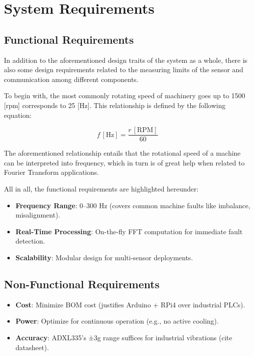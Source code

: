 \section{System Requirements} 
{ 
	
	
	\subsection{Functional Requirements} 
	{ 
		In addition to the aforementioned design traits of the system as a whole, there is also some design requirements related to the measuring limits of the sensor and communication among different components.
		
		To begin with, the most commonly rotating speed of machinery goes up to 1500 [rpm] corresponds to 25 [Hz]. This relationship is defined by the following equation: 
		
		\begin{equation}
			f \, [\mathrm{Hz}] = \frac{r \, [\mathrm{RPM}]}{60}
			\label{eq:freq_rpm}
		\end{equation}
		
		The aforementioned relationship entails that the rotational speed of a machine can be interpreted into frequency, which in turn is of great help when related to Fourier Transform applications.
		
		All in all, the functional requirements are highlighted hereunder:
		\begin{itemize}  
			\item \textbf{Frequency Range}: 0–300 Hz (covers common machine faults like imbalance, misalignment).  
			\item \textbf{Real-Time Processing}: On-the-fly FFT computation for immediate fault detection.  
			\item \textbf{Scalability}: Modular design for multi-sensor deployments.  
		\end{itemize}  
	}
	
	\subsection{Non-Functional Requirements} 
	{ 
		\begin{itemize}  
			\item \textbf{Cost}: Minimize BOM cost (justifies Arduino + RPi4 over industrial PLCs).  
			\item \textbf{Power}: Optimize for continuous operation (e.g., no active cooling).  
			\item \textbf{Accuracy}: ADXL335’s ±3g range suffices for industrial vibrations (cite datasheet).  
		\end{itemize}  
	}
	
}
